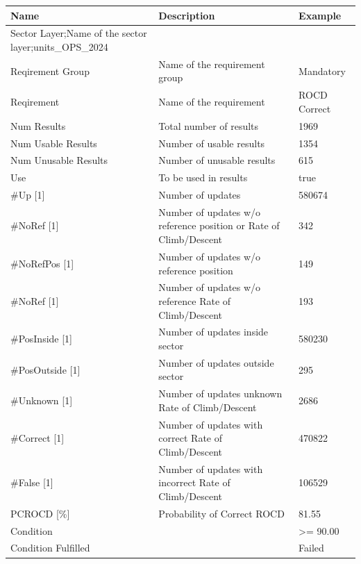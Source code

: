 \begin{center}
 \begin{table}[H]
  \begin{tabularx}{\textwidth}{ | l | X |  l | }
    \hline
    \textbf{Name} & \textbf{Description} & \textbf{Example} \\ \hline
    Sector Layer;Name of the sector layer;units\_OPS\_2024 \\ \hline
    Reqirement Group & Name of the requirement group & Mandatory \\ \hline
    Reqirement & Name of the requirement & ROCD Correct \\ \hline
    Num Results & Total number of results & 1969 \\ \hline
    Num Usable Results & Number of usable results & 1354 \\ \hline
    Num Unusable Results & Number of unusable results & 615 \\ \hline
    Use & To be used in results & true \\ \hline
    \#Up [1] & Number of updates & 580674 \\ \hline
    \#NoRef [1] & Number of updates w/o reference position or Rate of Climb/Descent & 342 \\ \hline
    \#NoRefPos [1] & Number of updates w/o reference position & 149 \\ \hline
    \#NoRef [1] & Number of updates w/o reference Rate of Climb/Descent & 193 \\ \hline
    \#PosInside [1] & Number of updates inside sector & 580230 \\ \hline
    \#PosOutside [1] & Number of updates outside sector & 295 \\ \hline
    \#Unknown [1] & Number of updates unknown Rate of Climb/Descent & 2686 \\ \hline
    \#Correct [1] & Number of updates with correct Rate of Climb/Descent & 470822 \\ \hline
    \#False [1] & Number of updates with incorrect Rate of Climb/Descent & 106529 \\ \hline
    PCROCD [\%] & Probability of Correct ROCD & 81.55 \\ \hline
    Condition &  & >= 90.00 \\ \hline
    Condition Fulfilled &  & Failed \\ \hline
\end{tabularx}
\end{table}
\end{center}

